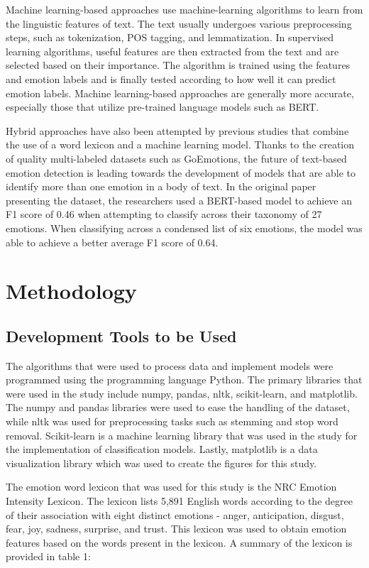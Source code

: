\documentclass[journal]{./IEEE/IEEEtran}
\begin{document}
Machine learning-based approaches use machine-learning algorithms to learn from the linguistic features of text. The text usually undergoes various preprocessing steps, such as tokenization, POS tagging, and lemmatization. In supervised learning algorithms, useful features are then extracted from the text and are selected based on their importance. The algorithm is trained using the features and emotion labels and is finally tested according to how well it can predict emotion labels. Machine learning-based approaches are generally more accurate, especially those that utilize pre-trained language models such as BERT\cite{Adoma1}.

Hybrid approaches have also been attempted by previous studies that combine the use of a word lexicon and a machine learning model\cite{Murthy1}. Thanks to the creation of quality multi-labeled datasets such as GoEmotions\cite{Demszky1}, the future of text-based emotion detection is leading towards the development of models that are able to identify more than one emotion in a body of text. In the original paper presenting the dataset, the researchers used a BERT-based model to achieve an F1 score of 0.46 when attempting to classify across their taxonomy of 27 emotions. When classifying across a condensed list of six emotions, the model was able to achieve a better average F1 score of 0.64.

\section{Methodology}
\subsection{Development Tools to be Used}
The algorithms that were used to process data and implement models were programmed using the programming language Python. The primary libraries that were used in the study include numpy, pandas, nltk, scikit-learn, and matplotlib. The numpy and pandas libraries were used to ease the handling of the dataset, while nltk was used for preprocessing tasks such as stemming and stop word removal. Scikit-learn\cite{sklearn1} is a machine learning library that was used in the study for the implementation of classification models. Lastly, matplotlib is a data visualization library which was used to create the figures for this study.

The emotion word lexicon that was used for this study is the NRC Emotion Intensity Lexicon\cite{Mohammad2}. The lexicon lists 5,891 English words according to the degree of their association with eight distinct emotions - anger, anticipation, disgust, fear, joy, sadness, surprise, and trust.  This lexicon was used to obtain emotion features based on the words present in the lexicon. A summary of the lexicon is provided in table 1:
\end{document}

